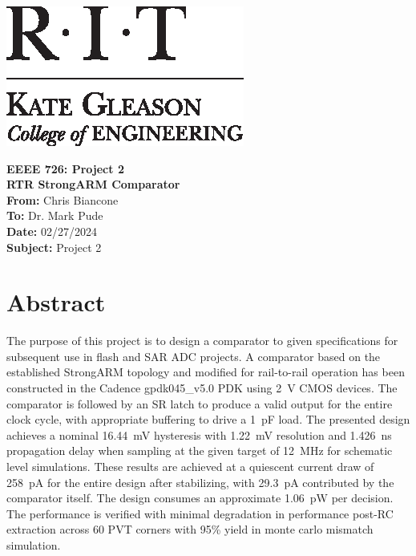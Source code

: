 \documentclass[11pt,letterpaper]{article}
\begin{document}
\VerbatimFootnotes %


	\hspace{5in}
	\includegraphics[scale=0.9,trim=0cm 0in 0in 0.0in,clip]{images/RIT_KGCOE1}
\newline

\Huge\textbf{EEEE 726: Project 2 \\RTR StrongARM Comparator}\\

\Large
\textbf{From:} Chris Biancone \\
\textbf{To: } Dr. Mark Pude \\
\textbf{Date: } 02/27/2024 \\
\textbf{Subject: } Project 2\\
\vspace{0.5in}

\section*{Abstract}
\normalsize
The purpose of this project is to design a comparator to given specifications for subsequent use in flash and SAR ADC projects. A comparator based on the established StrongARM topology and modified for rail-to-rail operation has been constructed in the Cadence gpdk045\_v5.0 PDK using \qty{2}{\V} CMOS devices. The comparator is followed by an SR latch to produce a valid output for the entire clock cycle, with appropriate buffering to drive a \qty{1}{\pF} load. The presented design achieves a nominal \qty{16.44}{\mV} hysteresis with \qty{1.22}{\mV} resolution and \qty{1.426}{\ns} propagation delay when sampling at the given target of \qty{12}{\MHz} for schematic level simulations. These results are achieved at a quiescent current draw of \qty{258}{\pA} for the entire design after stabilizing, with \qty{29.3}{\pA} contributed by the comparator itself. The design consumes an approximate \qty{1.06}{\pico\W} per decision. The performance is verified with minimal degradation in performance post-RC extraction across 60 PVT corners with 95\% yield in monte carlo mismatch simulation.
\end{document}
